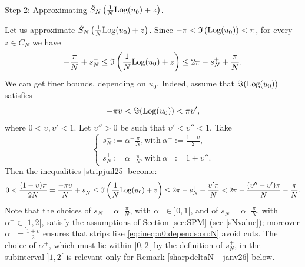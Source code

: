 \documentclass[11pt]{amsart}
\newcommand{\Log}{{\rm Log}}
\begin{document}
{\

\underline{Step 2: Approximating $\textstyle \hat S_N\left(\frac{1}{N}\Log(u_{0}) +z\right)$.}

Let us approximate $\textstyle \hat S_N\left(\frac{1}{N}\Log(u_{0}) +z\right)$. Since  $-\pi < \mathfrak{I}\left(\Log(u_{0})\right)<  \pi$, for every $z\in C_N$ we have
\begin{equation}\label{stripjuil25}
-\frac{\pi}{N}+s_N^-\leq \mathfrak{I}\left(\frac{1}{N}\Log(u_{0}) +z\right) \leq 2\pi -s_N^+ + \frac{\pi}{N}.
\end{equation}
We can get finer bounds, depending on $u_0$. Indeed, assume that $\Im(\Log(u_0))$ satisfies 
\begin{equation}\label{uniformu0janv26}
-\pi  \upsilon < \Im(\Log(u_0)) < \pi \upsilon',
\end{equation} where $0<\upsilon,\upsilon'<1$. Let $\upsilon''>0$ be such that $\upsilon'<\upsilon''<1$. Take
\begin{equation}\label{fixsN+-}
\left\lbrace \begin{array}{l} s_N^- := \alpha^- \frac{\pi}{N}, \mathrm{with\ } \alpha^-:= \frac{1+\upsilon}{2},\\ \\ s_N^+ := \alpha^+ \frac{\pi}{N}, \mathrm{with\ } \alpha^+:= 1+\upsilon''.
\end{array}\right.
\end{equation}
Then the inequalities \eqref{stripjuil25} become:
\begin{equation}\label{eq:ineq:u0:depends:on:N}
 0<\frac{(1-\upsilon)\pi}{2N}= \frac{-\pi\upsilon}{N}+s_N^-\leq \mathfrak{I}\left(\frac{1}{N}\Log(u_{0}) +z\right) \leq 2\pi -s_N^+ + \frac{\upsilon'\pi}{N} < 2\pi -\frac{(\upsilon''-\upsilon')\pi}{N}-\frac{\pi}{N}.
\end{equation}
Note that the choices of $\textstyle s_N^-= \alpha^- \frac{\pi}{N}$, with $\alpha^-\in ]0,1[$, and of $\textstyle s_N^+= \alpha^+ \frac{\pi}{N}$, with $\alpha^+\in ]1,2[$, satisfy the assumptions of Section \ref{sec:SPM} (see \eqref{sNvalue}); moreover $\textstyle \alpha^-= \frac{1+\upsilon}{2}$ ensures that strips like \eqref{eq:ineq:u0:depends:on:N} avoid cuts. The choice of $\alpha^+$, which must lie within $]0,2[$ by the definition of $s_N^+$, in the subinterval $]1,2[$ is relevant only for Remark \ref{sharpdeltaN+-janv26} below.

}
\end{document}
